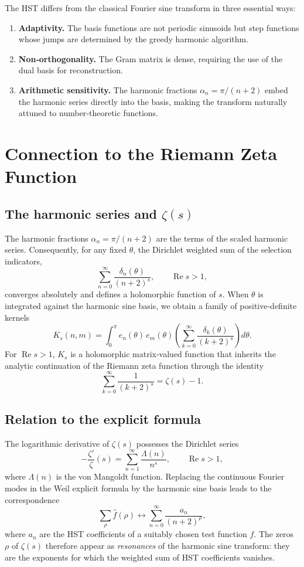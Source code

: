 \documentclass[11pt,a4paper]{article}
\begin{document}
The HST differs from the classical Fourier sine transform in three essential ways:
\begin{enumerate}[label=(\roman*)]
\item \textbf{Adaptivity.} The basis functions are not periodic sinusoids but step functions whose jumps are determined by the greedy harmonic algorithm.
\item \textbf{Non‑orthogonality.} The Gram matrix is dense, requiring the use of the dual basis for reconstruction.
\item \textbf{Arithmetic sensitivity.} The harmonic fractions $\alpha_n = \pi/(n+2)$ embed the harmonic series directly into the basis, making the transform naturally attuned to number‑theoretic functions.
\end{enumerate}

\section{Connection to the Riemann Zeta Function}
\subsection{The harmonic series and $\zeta(s)$}
The harmonic fractions $\alpha_n = \pi/(n+2)$ are the terms of the scaled harmonic series. Consequently, for any fixed $\theta$, the Dirichlet weighted sum of the selection indicators,
\[
\sum_{n=0}^\infty \frac{\delta_n(\theta)}{(n+2)^s}, \qquad \operatorname{Re} s > 1,
\]
converges absolutely and defines a holomorphic function of $s$. When $\theta$ is integrated against the harmonic sine basis, we obtain a family of positive‑definite kernels
\[
K_s(n,m) = \int_0^\pi e_n(\theta)\, e_m(\theta)
           \left( \sum_{k=0}^\infty \frac{\delta_k(\theta)}{(k+2)^s} \right) d\theta.
\]
For $\operatorname{Re} s > 1$, $K_s$ is a holomorphic matrix‑valued function that inherits the analytic continuation of the Riemann zeta function through the identity
\[
\sum_{k=0}^\infty \frac{1}{(k+2)^s} = \zeta(s) - 1.
\]

\subsection{Relation to the explicit formula}
The logarithmic derivative of $\zeta(s)$ possesses the Dirichlet series
\[
-\frac{\zeta'}{\zeta}(s) = \sum_{n=1}^\infty \frac{\Lambda(n)}{n^s}, \qquad \operatorname{Re} s > 1,
\]
where $\Lambda(n)$ is the von Mangoldt function. Replacing the continuous Fourier modes in the Weil explicit formula by the harmonic sine basis leads to the correspondence
\[
\sum_{\rho} \widehat{f}(\rho) \longleftrightarrow
\sum_{n=0}^\infty \frac{a_n}{(n+2)^\rho},
\]
where $a_n$ are the HST coefficients of a suitably chosen test function $f$. The zeros $\rho$ of $\zeta(s)$ therefore appear as \emph{resonances} of the harmonic sine transform: they are the exponents for which the weighted sum of HST coefficients vanishes.
\end{document}
